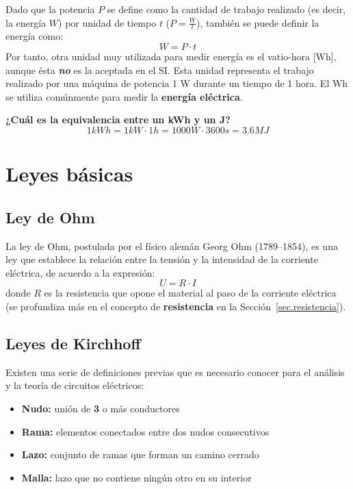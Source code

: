 	Dado que la potencia $P$ se define como la cantidad de trabajo
        realizado (es decir, la energía $W$) por unidad de tiempo $t$
        ($P=\frac{W}{t}$), también se puede definir la energía como:
	\begin{equation*}\label{eq.Ept}
          W=P\cdot t
	\end{equation*}
	Por tanto, otra unidad muy utilizada para medir energía es el
        vatio-hora [Wh], aunque ésta \textbf{\emph{no}} es la aceptada
        en el SI. Esta unidad representa el trabajo realizado por una
        máquina de potencia 1 W durante un tiempo de 1 hora. El Wh se
        utiliza comúnmente para medir la \textbf{energía eléctrica}.
	
	\vspace{4mm}
	\begin{example}
          \textbf{¿Cuál es la equivalencia entre un kWh y un J?}
          \begin{equation*}
            1 kWh = 1 kW \cdot 1 h = 1000 W \cdot 3600 s = 3.6 MJ 
          \end{equation*}
	\end{example}
	
	\section{Leyes básicas}
	
	\subsection{Ley de Ohm}
	
	La ley de Ohm, postulada por el físico alemán Georg Ohm
        (1789--1854), es una ley que establece la relación entre la
        tensión y la intensidad de la corriente eléctrica, de acuerdo
        a la expresión:
	\begin{equation}
          \boxed{ U=R\cdot I}
	\end{equation}
        donde $R$ es la resistencia que opone el material al paso de
        la corriente eléctrica (se profundiza más en el concepto de
        \textbf{resistencia} en la Sección~\ref{sec.resistencia}).
	
	\subsection{Leyes de Kirchhoff}
	
	Existen una serie de definiciones previas que es necesario
        conocer para el análisis y la teoría de circuitos eléctricos:
	\begin{itemize}
        \item \textbf{Nudo:} unión de \textbf{3} o más conductores
        \item \textbf{Rama:} elementos conectados entre dos nudos
          consecutivos
        \item \textbf{Lazo:} conjunto de ramas que forman un camino
          cerrado
        \item \textbf{Malla:} lazo que no contiene ningún otro en su
          interior
	\end{itemize}

